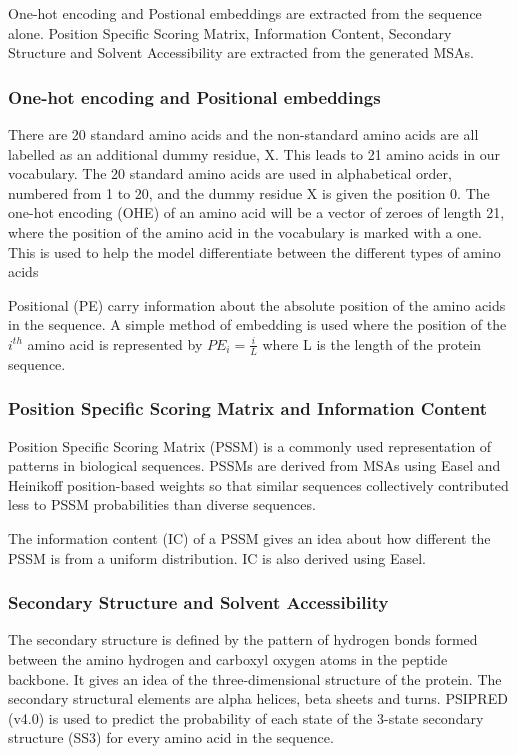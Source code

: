 \documentclass[journal=jacsat,manuscript=article]{achemso}
\begin{document}
One-hot encoding and Postional embeddings are extracted from the sequence alone. Position Specific Scoring Matrix, Information Content, Secondary Structure and Solvent Accessibility are extracted from the generated MSAs.

\subsubsection{One-hot encoding and Positional embeddings}
\quad There are 20 standard amino acids and the non-standard amino acids are all labelled as an additional dummy residue, X. This leads to 21 amino acids in our vocabulary. The 20 standard amino acids are used in alphabetical order, numbered from 1 to 20, and the dummy residue X is given the position 0. The one-hot encoding (OHE) of an amino acid will be a vector of zeroes of length 21, where the position of the amino acid in the vocabulary is marked with a one. This is used to help the model differentiate between the different types of amino acids

Positional  (PE) carry information about the absolute position of the amino acids in the sequence. A simple method of embedding is used where the position of the $i^{th}$ amino acid is represented by ${PE}_{i} = \frac{i}{L}$ where L is the length of the protein sequence.

\subsubsection{Position Specific Scoring Matrix and Information Content}
\quad Position Specific Scoring Matrix (PSSM) is a commonly used representation of patterns in biological sequences. PSSMs are derived from MSAs using Easel \cite{potter2018hmmer} and Heinikoff position-based weights so that similar sequences collectively contributed less to PSSM probabilities than diverse sequences.

The information content (IC) of a PSSM gives an idea about how different the PSSM is from a uniform distribution. IC is also derived using Easel.

\subsubsection{Secondary Structure and Solvent Accessibility}
\quad The secondary structure is defined by the pattern of hydrogen bonds formed between the amino hydrogen and carboxyl oxygen atoms in the peptide backbone. It gives an idea of the three-dimensional structure of the protein. The secondary structural elements are alpha helices, beta sheets and turns. PSIPRED (v4.0) \cite{jones1999protein} is used to predict the probability of each state of the 3-state secondary structure (SS3) for every amino acid in the sequence.
\end{document}
